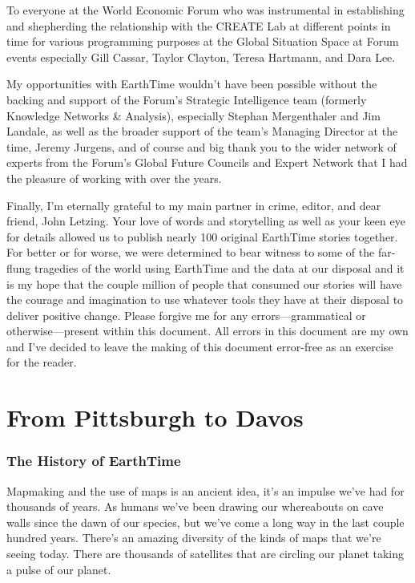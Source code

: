 \documentclass[
  12pt,
]{krantz}
\begin{document}
To everyone at the World Economic Forum who was instrumental in establishing and shepherding the relationship with the CREATE Lab at different points in time for various programming purposes at the Global Situation Space at Forum events especially Gill Cassar, Taylor Clayton, Teresa Hartmann, and Dara Lee.

My opportunities with EarthTime wouldn't have been possible without the backing and support of the Forum's Strategic Intelligence team (formerly Knowledge Networks \& Analysis), especially Stephan Mergenthaler and Jim Landale, as well as the broader support of the team's Managing Director at the time, Jeremy Jurgens, and of course and big thank you to the wider network of experts from the Forum's Global Future Councils and Expert Network that I had the pleasure of working with over the years.

Finally, I'm eternally grateful to my main partner in crime, editor, and dear friend, John Letzing. Your love of words and storytelling as well as your keen eye for details allowed us to publish nearly 100 original EarthTime stories together. For better or for worse, we were determined to bear witness to some of the far-flung tragedies of the world using EarthTime and the data at our disposal and it is my hope that the couple million of people that consumed our stories will have the courage and imagination to use whatever tools they have at their disposal to deliver positive change. Please forgive me for any errors---grammatical or otherwise---present within this document. All errors in this document are my own and I've decided to leave the making of this document error-free as an exercise for the reader.

\hypertarget{part-from-pittsburgh-to-davos}{%
\part{From Pittsburgh to Davos}\label{part-from-pittsburgh-to-davos}}

\hypertarget{the-history-of-earthtime}{%
\section{The History of EarthTime}\label{the-history-of-earthtime}}

Mapmaking and the use of maps is an ancient idea, it's an impulse we've had for thousands of years. As humans we've been drawing our whereabouts on cave walls since the dawn of our species, but we've come a long way in the last couple hundred years. There's an amazing diversity of the kinds of maps that we're seeing today. There are thousands of satellites that are circling our planet taking a pulse of our planet.
\end{document}
